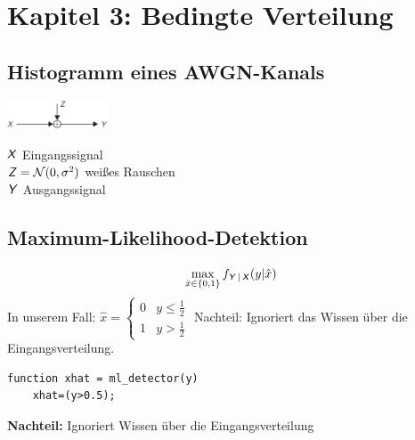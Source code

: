 \documentclass[deutsch]{latex4ei/latex4ei_sheet}
\begin{document}
\vfill

\section{Kapitel 3: Bedingte Verteilung}
\begin{sectionbox}
	\subsection{Histogramm eines AWGN-Kanals}
	\parbox{3.3cm}{
	\includegraphics[width = 3cm]{img/awgn-channel.png}
	}
	\parbox{4cm}{
		$\operatorname{\textsf{\textit{X}}}$ Eingangssignal\\
		$\operatorname{\textsf{\textit{Z}}} = \mathcal N(0, \sigma^2)$ weißes Rauschen\\
		$\operatorname{\textsf{\textit{Y}}}$ Ausgangssignal
		}
	
\end{sectionbox}

\begin{sectionbox}
	\subsection{Maximum-Likelihood-Detektion}
	\[ \max_{\hat x \in \{0,1\}}f_{\operatorname{\textsf{\textit{Y}}}|\operatorname{\textsf{\textit{X}}}}(y|\hat x) \]
	In unserem Fall: $\hat x = \begin{cases}
	0 & y\le \frac{1}{2}\\
	1 & y > \frac{1}{2}
	\end{cases}$
	Nachteil: Ignoriert das Wissen über die Eingangsverteilung.\\
	\begin{lstlisting}[gobble=4]
	function xhat = ml_detector(y)
	xhat=(y>0.5);
	\end{lstlisting}
	\textbf{Nachteil:} Ignoriert Wissen über die Eingangsverteilung \\
\end{sectionbox}
\end{document}
